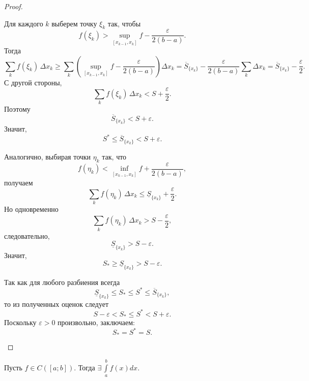 \documentclass[12pt]{article}
\newcommand{\dint}{\displaystyle\int}
\begin{document}
\begin{proof}
\begin{itemize}
            Для каждого $k$ выберем точку $\xi_k$ так, чтобы
            \[
                f(\xi_k) > \sup_{[x_{k-1},x_k]} f - \frac{\varepsilon}{2(b-a)}.
            \]
            Тогда
            \[
                \sum_k f(\xi_k)\,\Delta x_k
                \ge
                \sum_k \left(\sup_{[x_{k-1},x_k]} f - \frac{\varepsilon}{2(b-a)}\right)\Delta x_k
                =
                \overline S_{\{x_k\}} - \frac{\varepsilon}{2(b-a)}\sum_k \Delta x_k
                =
                \overline S_{\{x_k\}} - \frac{\varepsilon}{2}.
            \]
            С другой стороны,
            \[
                \sum_k f(\xi_k)\,\Delta x_k < S + \frac{\varepsilon}{2}.
            \]
            Поэтому
            \[
                \overline S_{\{x_k\}} < S + \varepsilon.
            \]
            Значит,
            \[
                S^* \le \overline S_{\{x_k\}} < S + \varepsilon.
            \]
            
            Аналогично, выбирая точки $\eta_k$ так, что
            \[
                f(\eta_k) < \inf_{[x_{k-1},x_k]} f + \frac{\varepsilon}{2(b-a)},
            \]
            получаем
            \[
                \sum_k f(\eta_k)\,\Delta x_k
                \le
                \underline S_{\{x_k\}} + \frac{\varepsilon}{2}.
            \]
            Но одновременно
            \[
                \sum_k f(\eta_k)\,\Delta x_k > S - \frac{\varepsilon}{2},
            \]
            следовательно,
            \[
                \underline S_{\{x_k\}} > S - \varepsilon.
            \]
            Значит,
            \[
                S_* \ge \underline S_{\{x_k\}} > S - \varepsilon.
            \]
            
            Так как для любого разбиения всегда
            \[
                \underline S_{\{x_k\}} \le S_* \le S^* \le \overline S_{\{x_k\}},
            \]
            то из полученных оценок следует
            \[
                S - \varepsilon < S_* \le S^* < S + \varepsilon.
            \]
            Поскольку $\varepsilon > 0$ произвольно, заключаем:
            \[
                S_* = S^* = S.
            \]
        \end{itemize}
    \end{proof}
	
	\begin{theorem}[Вейерштрасса]
		Пусть $f \in C([a; b])$. Тогда $\exists \, \dint\limits_a^b f(x) dx$.
	\end{theorem}
	
\end{document}
